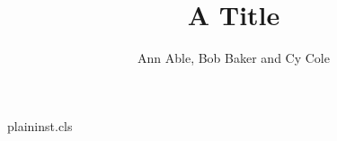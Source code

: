 \begin{filecontents*}[overwrite]{plaininst.cls}
\def\institute#1{\gdef\@institute{#1}}
\def\institutename{\par\begingroup\parindent=0pt
 \def\and{\unskip; \ignorespaces}%
 \small\@institute\par\endgroup}
\def\inst#1{\unskip$^{#1}$}
\def\@maketitle{\newpage\noindent{\Large\@title\par}\vskip6pt
  {\large\noindent\ignorespaces\@author\par}\vskip6pt
  \institutename}
\end{filecontents*}
\documentclass{plaininst}

\title{A Title}
\author{Ann Able, Bob Baker and Cy Cole}
\maketitle
Text.

